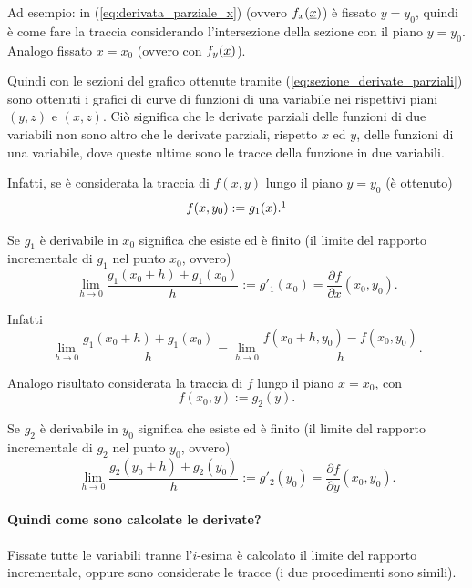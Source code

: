 Ad esempio: in (\ref{eq:derivata_parziale_x}) (ovvero $f_x(\uline x)$) è fissato $y=y_0$, quindi è come fare la traccia considerando l'intersezione della sezione con il piano $y=y_0$. Analogo fissato $x=x_0$ (ovvero con $f_y(\uline x)$).

Quindi con le sezioni del grafico ottenute tramite (\ref{eq:sezione_derivate_parziali}) sono ottenuti i grafici di curve di funzioni di una variabile nei rispettivi piani $(y,z)$ e $(x,z)$. Ciò significa che le derivate parziali delle funzioni di due variabili non sono altro che le derivate parziali, rispetto $x$ ed $y$, delle funzioni di una variabile, dove queste ultime sono le tracce della funzione in due variabili.

Infatti, se è considerata la traccia di $f(x,y)$ lungo il piano $y=y_0$ (è ottenuto)
\begin{equation*}
    f(x,y_0):=g_1(x). \footnotemark
\end{equation*}

Se $g_1$ è derivabile in $x_0$ significa che esiste ed è finito (il limite del rapporto incrementale di $g_1$ nel punto $x_0$, ovvero)
\begin{equation*}
    \lim_{h\rightarrow 0}\frac{g_1(x_0+h)+g_1(x_0)}{h}:=g'_1(x_0)=\frac{\partial f}{\partial x}(x_0,y_0).
\end{equation*}

Infatti
\begin{equation*}
    \lim_{h\rightarrow 0}\frac{g_1(x_0+h)+g_1(x_0)}{h}=\lim_{h\rightarrow 0}\frac{f(x_0+h,y_0)-f(x_0,y_0)}{h}.
\end{equation*}

Analogo risultato considerata la traccia di $f$ lungo il piano $x=x_0$, con
\begin{equation*}
    f(x_0,y):=g_2(y).
\end{equation*}

Se $g_2$ è derivabile in $y_0$ significa che esiste ed è finito (il limite del rapporto incrementale di $g_2$ nel punto $y_0$, ovvero)
\begin{equation*}
    \lim_{h\rightarrow 0}\frac{g_2(y_0+h)+g_2(y_0)}{h}:=g'_2(y_0)=\frac{\partial f}{\partial y}(x_0,y_0).
\end{equation*}

\paragraph{Quindi come sono calcolate le derivate?} Fissate tutte le variabili tranne l'$i$-esima è calcolato il limite del rapporto incrementale, oppure sono considerate le tracce (i due procedimenti sono simili).

